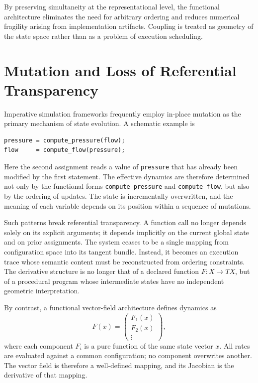 \documentclass[12pt]{book}
\begin{document}
By preserving simultaneity at the representational level, the
functional architecture eliminates the need for arbitrary ordering and
reduces numerical fragility arising from implementation artifacts.
Coupling is treated as geometry of the state space rather than as a
problem of execution scheduling.

\section{Mutation and Loss of Referential Transparency}

Imperative simulation frameworks frequently employ in-place mutation as
the primary mechanism of state evolution. A schematic example is

\begin{verbatim}
pressure = compute_pressure(flow);
flow     = compute_flow(pressure);
\end{verbatim}

Here the second assignment reads a value of \texttt{pressure} that has
already been modified by the first statement. The effective dynamics
are therefore determined not only by the functional forms
\texttt{compute\_pressure} and \texttt{compute\_flow}, but also by the
ordering of updates. The state is incrementally overwritten, and the
meaning of each variable depends on its position within a sequence of
mutations.

Such patterns break referential transparency. A function call no longer
depends solely on its explicit arguments; it depends implicitly on the
current global state and on prior assignments. The system ceases to be
a single mapping from configuration space into its tangent bundle.
Instead, it becomes an execution trace whose semantic content must be
reconstructed from ordering constraints. The derivative structure is
no longer that of a declared function $F : X \to TX$, but of a
procedural program whose intermediate states have no independent
geometric interpretation.

By contrast, a functional vector-field architecture defines dynamics as
\[
F(x) =
\begin{pmatrix}
F_1(x) \\
F_2(x) \\
\vdots
\end{pmatrix},
\]
where each component $F_i$ is a pure function of the same state vector
$x$. All rates are evaluated against a common configuration; no
component overwrites another. The vector field is therefore a
well-defined mapping, and its Jacobian is the derivative of that
mapping.
\end{document}
